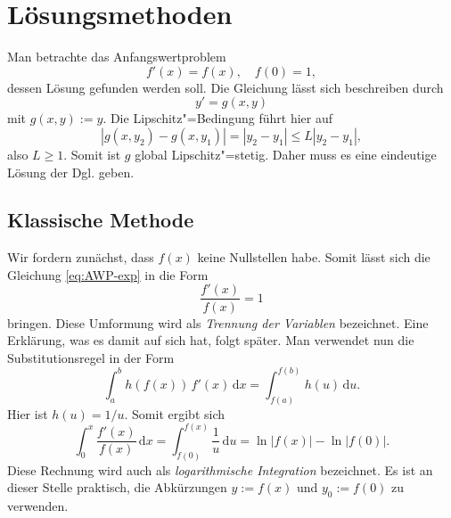 \documentclass[a4paper,11pt,fleqn,twocolumn,twoside,openany]{scrartcl}
\numberwithin{equation}{section}
\theoremstyle{defstyle}
\numberwithin{Definition}{section}
\begin{document}
\section{Lösungsmethoden}
Man betrachte das Anfangswertproblem
\begin{equation}\label{eq:AWP-exp}
f'(x) = f(x), \quad f(0)=1,
\end{equation}
dessen Lösung gefunden werden soll. Die Gleichung lässt sich
beschreiben durch%
\begin{equation}
y' = g(x,y)
\end{equation}
mit $g(x,y):=y$. Die Lipschitz"=Bedingung führt hier auf%
\begin{equation}
|g(x,y_2)-g(x,y_1)| = |y_2-y_1|\le L|y_2-y_1|,
\end{equation}
also $L\ge 1$. Somit ist $g$ global Lipschitz"=stetig. Daher muss
es eine eindeutige Lösung der Dgl. geben.

\subsection{Klassische Methode}
Wir fordern zunächst, dass $f(x)$ keine Nullstellen habe. Somit
lässt sich die Gleichung \eqref{eq:AWP-exp} in die Form%
\begin{equation}\label{eq:AWP-exp-Umformung}
\frac{f'(x)}{f(x)}=1
\end{equation}
bringen. Diese Umformung wird als \emph{Trennung der Variablen}
bezeichnet. Eine Erklärung, was es damit auf sich hat, folgt später.
Man verwendet nun die Substitutionsregel in der Form%
\begin{equation}
\int_a^b h(f(x))\,f'(x)\,\mathrm dx
= \int_{f(a)}^{f(b)} h(u)\,\mathrm du.
\end{equation}
Hier ist $h(u)=1/u$. Somit ergibt sich%
\begin{equation}
\int_0^x \frac{f'(x)}{f(x)}\,\mathrm dx
= \int_{f(0)}^{f(x)} \frac{1}{u}\,\mathrm du
= \ln|f(x)|-\ln|f(0)|.
\end{equation}
Diese Rechnung wird auch als \emph{logarithmische Integration}
bezeichnet. Es ist an dieser Stelle praktisch, die Abkürzungen
$y:=f(x)$ und $y_0:=f(0)$ zu verwenden.
\end{document}
